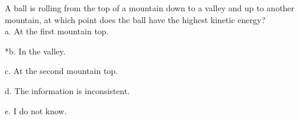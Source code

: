 
A ball is rolling from the top of a mountain down to a valley and up to another mountain, at which point does the ball have the highest kinetic energy?\\

a. At the first mountain top.

*b. In the valley.

c. At the second mountain top.

d. The information is inconsistent. 

e. I do not know. \\
